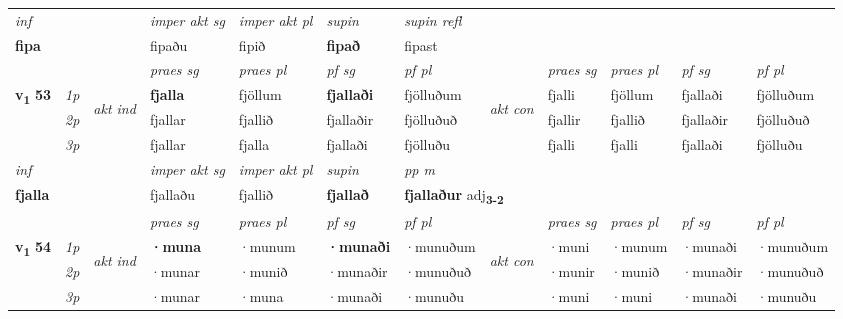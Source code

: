 \begin{longtable}[l]{X>{\footnotesize\itshape}llXXXXlXXXX}
\cmidrule{4-7}
   {\textit{inf}} & &  & \textit{imper akt sg} & \textit{imper akt pl}    & \textit{supin} & \textit{supin refl}  \\*
  {\textbf{fipa}} & && fipaðu  & fipið    &  \textbf{fipað} & fipast  \\*

\midrule

 & &   & \textit{praes sg}  & \textit{praes pl}    & \textit{ pf sg} & \textit{pf pl} & & \textit{praes sg}  & \textit{praes pl}    & \textit{pf sg} & \textit{pf pl }  \\ \cmidrule{4-7} \cmidrule{9-12}
 \multirow{2}{*}{{{\textbf{v{\textsubscript{1}}} \Large{\textbf{53}}}}}  & 1p & \multirow{3}{*}{\begin{turn}{90}\textit{akt ind}\end{turn}} & \textbf{fjalla} & fjöllum & \textbf{fjallaði} & fjölluðum & \multirow{3}{*}{\begin{turn}{90}\textit{akt con}\end{turn}} &fjalli & fjöllum & fjallaði & fjölluðum\\*
 & 2p &  &  fjallar  & fjallið & fjallaðir & fjölluðuð & & fjallir & fjallið & fjallaðir & fjölluðuð \\*
 & 3p &  & fjallar & fjalla & fjallaði & fjölluðu & & fjalli & fjalli& fjallaði & fjölluðu \\*
\cmidrule{4-7} \cmidrule{9-12}

   {\textit{inf}} & &  & \textit{imper akt sg} & \textit{imper akt pl}    & \textit{supin}  & \textit{pp m} \\*
  {\textbf{fjalla}} & && fjallaðu  & fjallið    &  \textbf{fjallað}  & \multicolumn{2}{l}{\textbf{fjallaður} adj\textbf{\textsubscript{3-2}}} \\*

\midrule

 & &   & \textit{praes sg}  & \textit{praes pl}    & \textit{ pf sg} & \textit{pf pl} & & \textit{praes sg}  & \textit{praes pl}    & \textit{pf sg} & \textit{pf pl }  \\ \cmidrule{4-7} \cmidrule{9-12}
 \multirow{2}{*}{{{\textbf{v{\textsubscript{1}}} \Large{\textbf{54}}}}}  & 1p & \multirow{3}{*}{\begin{turn}{90}\textit{akt ind}\end{turn}} & \textbf{·muna} & ·munum & \textbf{·munaði} & ·munuðum & \multirow{3}{*}{\begin{turn}{90}\textit{akt con}\end{turn}} &·muni & ·munum & ·munaði & ·munuðum\\*
 & 2p &  &  ·munar  & ·munið & ·munaðir & ·munuðuð & & ·munir & ·munið & ·munaðir & ·munuðuð \\*
 & 3p &  & ·munar & ·muna & ·munaði & ·munuðu & & ·muni & ·muni& ·munaði & ·munuðu \\*
\cmidrule{4-7} \cmidrule{9-12}


\end{longtable}
